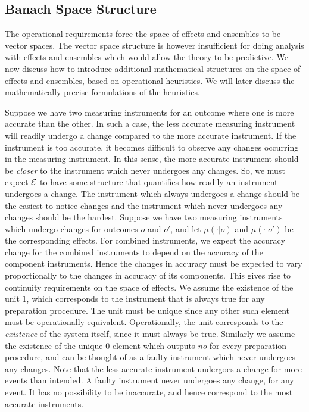 \documentclass[11pt]{article}
\begin{document}

\subsection*{Banach Space Structure}
The operational requirements force the space of effects and ensembles to be vector spaces. The vector space structure is however insufficient for doing analysis with effects and ensembles which would allow the theory to be predictive. We now discuss how to introduce additional mathematical structures on the space of effects and ensembles, based on operational heuristics. We will later discuss the mathematically precise formulations of the heuristics.

Suppose we have two measuring instruments for an outcome where one is more accurate than the other. In such a case, the less accurate measuring instrument will readily undergo a change compared to the more accurate instrument. If the instrument is too accurate, it becomes difficult to observe any changes occurring in the measuring instrument. In this sense, the more accurate instrument should be \emph{closer} to the instrument which never undergoes any changes. So, we must expect $\mathcal{E}$ to have some structure that quantifies how readily an instrument undergoes a change. The instrument which always undergoes a change should be the easiest to notice changes and the instrument which never undergoes any changes should be the hardest. Suppose we have two measuring instruments which undergo changes for outcomes $o$ and $o'$, and let $\mu(\cdot|o)$ and $\mu(\cdot|o')$ be the corresponding effects. For combined instruments, we expect the accuracy change for the combined instruments to depend on the accuracy of the component instruments. Hence the changes in accuracy must be expected to vary proportionally to the changes in accuracy of its components. This gives rise to continuity requirements on the space of effects. We assume the existence of the unit $1$, which corresponds to the instrument that is always true for any preparation procedure. The unit must be unique since any other such element must be operationally equivalent. {Operationally, the unit corresponds to the \emph{existence} of the system itself, since it must always be true.} Similarly we assume the existence of the unique $0$ element which outputs \emph{no} for every preparation procedure, and can be thought of as a faulty instrument which never undergoes any changes. Note that the less accurate instrument undergoes a change for more events than intended. A faulty instrument never undergoes any change, for any event. It has no possibility to be inaccurate, and hence correspond to the most accurate instruments.
\end{document}
